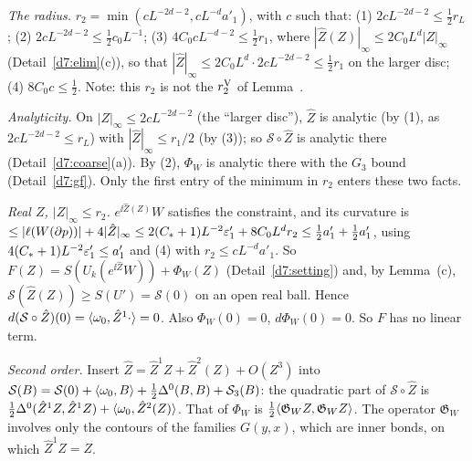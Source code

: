 \begin{detail}\label{d7:quad}
\emph{The radius.} $r_2=\min(cL^{-2d-2},cL^{-d}a'_1)$, with $c$ such that: (1) $2cL^{-2d-2}\le\frac12r_L$; (2) $2cL^{-2d-2}\le\frac12c_0L^{-1}$; (3) $4C_0cL^{-d-2}\le\frac12r_1$, where $|\hat Z(Z)|_\infty\le2C_0L^d|Z|_\infty$ (Detail~\ref{d7:elim}(c)), so that $|\hat Z|_\infty\le2C_0L^d\cdot2cL^{-2d-2}\le\frac12r_1$ on the larger disc; (4) $8C_0c\le\frac12$. Note: this $r_2$ is not the $r_2^{\rm V}$ of Lemma~.
\begin{step}
\emph{Analyticity.} On $|Z|_\infty\le2cL^{-2d-2}$ (the ``larger disc''), $\hat Z$ is analytic (by (1), as $2cL^{-2d-2}\le r_L$) with $|\hat Z|_\infty\le r_1/2$ (by (3)); so $\mathcal S\circ\hat Z$ is analytic there (Detail~\ref{d7:coarse}(a)). By (2), $\Phi_W$ is analytic there with the $G_3$ bound (Detail~\ref{d7:gf}). Only the first entry of the minimum in $r_2$ enters these two facts.
\end{step}
\begin{step}
\emph{Real $Z$, $|Z|_\infty\le r_2$.} $e^{\ii\hat Z(Z)}W$ satisfies the constraint, and its curvature is $\le|\ell(W(\partial p))|+4|\hat Z|_\infty\le2(C_*+1)L^{-2}\varepsilon'_1+8C_0L^dr_2\le\frac12a'_1+\frac12a'_1$, using $4(C_*+1)L^{-2}\varepsilon'_1\le a'_1$ and (4) with $r_2\le cL^{-d}a'_1$. So $F(Z)=S(U_k(e^{\ii\hat Z}W))+\Phi_W(Z)$ (Detail~\ref{d7:setting}) and, by Lemma~(c), $\mathcal S(\hat Z(Z))\ge S(U')=\mathcal S(0)$ on an open real ball. Hence $d(\mathcal S\circ\hat Z)(0)=\langle \omega_0,\hat Z^1\cdot\rangle=0$. Also $\Phi_W(0)=0$, $d\Phi_W(0)=0$. So $F$ has no linear term.
\end{step}
\begin{step}
\emph{Second order.} Insert $\hat Z=\hat Z^1Z+\hat Z^2(Z)+O(Z^3)$ into $\mathcal S(B)=\mathcal S(0)+\langle \omega_0,B\rangle+\frac12\Delta^0(B,B)+\mathcal S_3(B)$: the quadratic part of $\mathcal S\circ\hat Z$ is $\frac12\Delta^0(\hat Z^1Z,\hat Z^1Z)+\langle \omega_0,\hat Z^2(Z)\rangle$. That of $\Phi_W$ is $\frac12\langle \mathfrak G_WZ,\mathfrak G_WZ\rangle$. The operator $\mathfrak G_W$ involves only the contours of the families $G(y,x)$, which are inner bonds, on which $\hat Z^1Z=Z$.
\end{step}
\begin{step}

\end{step}
\end{detail}
